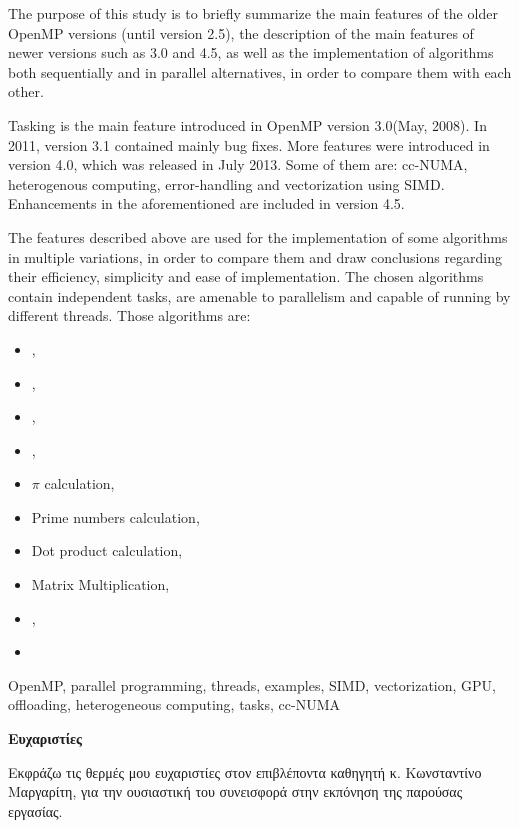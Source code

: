 The purpose of this study is to briefly summarize the main features of the older OpenMP versions (until version 2.5), the description of the main features of newer versions such as 3.0 and 4.5, as well as the implementation of algorithms both sequentially and in parallel alternatives, in order to compare them with each other.

Tasking is the main feature introduced in OpenMP version 3.0(May, 2008). In 2011, version 3.1 contained mainly bug fixes. More features were introduced in version 4.0, which was released in July 2013. Some of them are: cc-NUMA, heterogenous computing, error-handling and vectorization using SIMD. Enhancements in the aforementioned are included in version 4.5.

The features described above are used for the implementation of some algorithms in multiple variations, in order to compare them and draw conclusions regarding their efficiency, simplicity and ease of implementation. The chosen algorithms contain independent tasks, are amenable to parallelism and capable of running by different threads. Those algorithms are:

\begin{itemize}
\setlength\itemsep{-1em}
    \item {}, 
    \item {},
    \item {},
    \item {},
    \item $\pi$ calculation, 
    \item Prime numbers calculation,
    \item Dot product calculation,
    \item Matrix Multiplication,
    \item {},
    \item {}
\end{itemize}

\indent \textbf{}
OpenMP, parallel programming, threads, examples, SIMD, vectorization, GPU, offloading, heterogeneous computing, tasks, cc-NUMA

\clearpage
{}
\begin{flushleft}
{\large \textbf{Ευχαριστίες}}\\[0.5 cm]
\end{flushleft}
Εκφράζω τις θερμές μου ευχαριστίες στον επιβλέποντα καθηγητή κ. Κωνσταντίνο Μαργαρίτη, για την
ουσιαστική του συνεισφορά στην εκπόνηση της παρούσας εργασίας.

\clearpage
\singlespacing
\tableofcontents

\renewcommand{\listfigurename}{Κατάλογος Εικόνων}
\clearpage
\listoffigures

\renewcommand{\listtablename}{Κατάλογος Πινάκων}
\clearpage
\listoftables

\clearpage
\begin{flushleft}
\lstlistoflistings
\end{flushleft}

\clearpage
\setcounter{page}{1}
